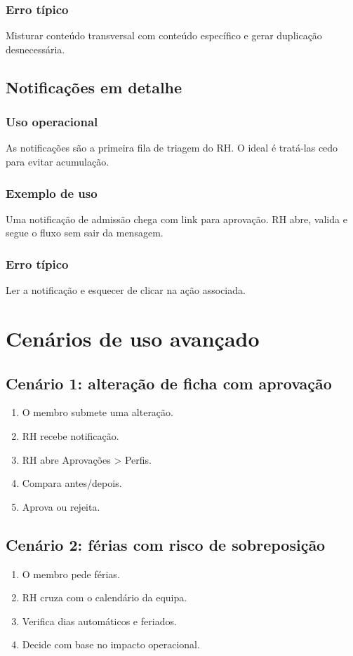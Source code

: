 \subsection{Erro típico}
Misturar conteúdo transversal com conteúdo específico e gerar duplicação desnecessária.

\section{Notificações em detalhe}
\subsection{Uso operacional}
As notificações são a primeira fila de triagem do RH. O ideal é tratá-las cedo para evitar acumulação.

\subsection{Exemplo de uso}
Uma notificação de admissão chega com link para aprovação. RH abre, valida e segue o fluxo sem sair da mensagem.

\subsection{Erro típico}
Ler a notificação e esquecer de clicar na ação associada.

\chapter{Cenários de uso avançado}
\section{Cenário 1: alteração de ficha com aprovação}
\begin{enumerate}
  \item O membro submete uma alteração.
  \item RH recebe notificação.
  \item RH abre Aprovações > Perfis.
  \item Compara antes/depois.
  \item Aprova ou rejeita.
\end{enumerate}

\section{Cenário 2: férias com risco de sobreposição}
\begin{enumerate}
  \item O membro pede férias.
  \item RH cruza com o calendário da equipa.
  \item Verifica dias automáticos e feriados.
  \item Decide com base no impacto operacional.
\end{enumerate}

